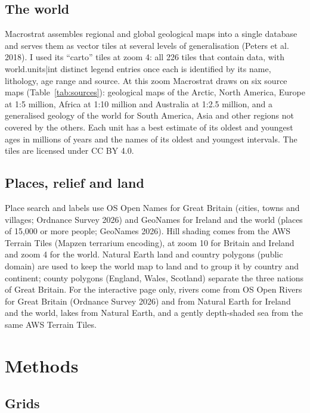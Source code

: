 \documentclass[11pt,a4paper]{article}
\begin{document}
\subsection{The world}

Macrostrat assembles regional and global geological maps into a single database and serves them as vector tiles at several levels of generalisation (Peters et al. 2018). I used its ``carto'' tiles at zoom 4: all 226 tiles that contain data, with {{world.units|int}} distinct legend entries once each is identified by its name, lithology, age range and source. At this zoom Macrostrat draws on six source maps (Table~\ref{tab:sources}): geological maps of the Arctic, North America, Europe at 1:5 million, Africa at 1:10 million and Australia at 1:2.5 million, and a generalised geology of the world for South America, Asia and other regions not covered by the others. Each unit has a best estimate of its oldest and youngest ages in millions of years and the names of its oldest and youngest intervals. The tiles are licensed under CC BY 4.0.

\subsection{Places, relief and land}

Place search and labels use OS Open Names for Great Britain (cities, towns and villages; Ordnance Survey 2026) and GeoNames for Ireland and the world (places of 15,000 or more people; GeoNames 2026). Hill shading comes from the AWS Terrain Tiles (Mapzen terrarium encoding), at zoom 10 for Britain and Ireland and zoom 4 for the world. Natural Earth land and country polygons (public domain) are used to keep the world map to land and to group it by country and continent; county polygons (England, Wales, Scotland) separate the three nations of Great Britain. For the interactive page only, rivers come from OS Open Rivers for Great Britain (Ordnance Survey 2026) and from Natural Earth for Ireland and the world, lakes from Natural Earth, and a gently depth-shaded sea from the same AWS Terrain Tiles.

\section{Methods}

\subsection{Grids}
\end{document}
